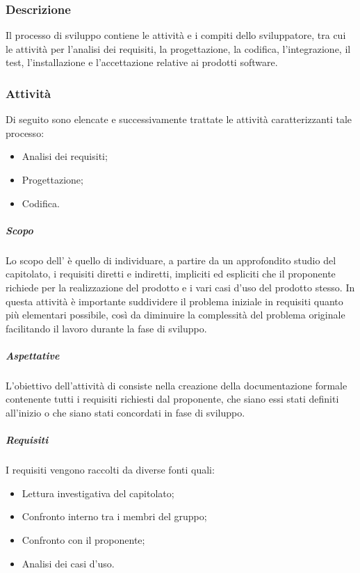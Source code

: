     \subsubsection{Descrizione} \label{subsubsection:Sviluppo_Descrizione}
    Il processo di sviluppo contiene le attività e i compiti dello sviluppatore, tra cui le attività per l'analisi dei requisiti, la progettazione, 
    la codifica, l'integrazione, il test, l'installazione e l'accettazione relative ai prodotti software.

    \subsubsection{Attività} \label{subsubsection:Attivita'}
    Di seguito sono elencate e successivamente trattate le attività caratterizzanti tale processo:
    \begin{itemize}
        \item Analisi dei requisiti;
        \item Progettazione;
        \item Codifica.
    \end{itemize}
    
        \paragraph{\docNameAdR} \label{paragraph:Analisi dei requisiti}
            \subparagraph{Scopo}
            Lo scopo dell'\docNameAdRLow{} è quello di individuare, a partire da un approfondito studio del capitolato, i requisiti diretti e indiretti,
            impliciti ed espliciti che il proponente richiede per la realizzazione del prodotto e i vari casi d'uso del prodotto stesso. In questa attività è importante
            suddividere il problema iniziale in requisiti quanto più elementari possibile, così da diminuire la complessità del problema originale
            facilitando il lavoro durante la fase di sviluppo.

            \subparagraph{Aspettative} \label{subparagraph:ADR_Aspettative}
            L'obiettivo dell'attività di \docNameAdRLow{} consiste nella creazione della documentazione formale contenente tutti i requisiti 
            richiesti dal proponente, che siano essi stati definiti all'inizio o che siano stati concordati in fase di sviluppo.

            \subparagraph{Requisiti} \label{subparagraph:Requisiti}
            I requisiti vengono raccolti da diverse fonti quali:
            \begin{itemize}
               \item Lettura investigativa del capitolato;
                \item Confronto interno tra i membri del gruppo;
                \item Confronto con il proponente;
                \item Analisi dei casi d'uso.
            \end{itemize}

